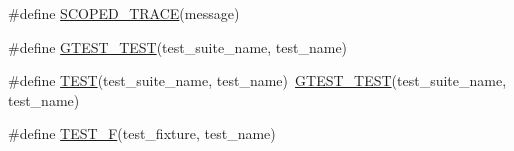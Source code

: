 \begin{DoxyCompactItemize}
\item 
\#define \mbox{\hyperlink{_obj__test_2lib_2googletest-master_2googletest_2include_2gtest_2gtest_8h_a4dac08f15adc8cb1ee0e5c1bfb0f440d}{S\+C\+O\+P\+E\+D\+\_\+\+T\+R\+A\+CE}}(message)
\item 
\#define \mbox{\hyperlink{_obj__test_2lib_2googletest-master_2googletest_2include_2gtest_2gtest_8h_a216a746d9241b1f42fdd4449698a4d8d}{G\+T\+E\+S\+T\+\_\+\+T\+E\+ST}}(test\+\_\+suite\+\_\+name,  test\+\_\+name)
\item 
\#define \mbox{\hyperlink{_obj__test_2lib_2googletest-master_2googletest_2include_2gtest_2gtest_8h_ab5540a6d621853916be8240ff51819cf}{T\+E\+ST}}(test\+\_\+suite\+\_\+name,  test\+\_\+name)~\mbox{\hyperlink{_obj__test_2lib_2googletest-release-1_88_81_2googletest_2test_2gtest__unittest_8cc_a54247aeadc0617105812dca8609638de}{G\+T\+E\+S\+T\+\_\+\+T\+E\+ST}}(test\+\_\+suite\+\_\+name, test\+\_\+name)
\item 
\#define \mbox{\hyperlink{_obj__test_2lib_2googletest-master_2googletest_2include_2gtest_2gtest_8h_a0ee66d464d1a06c20c1929cae09d8758}{T\+E\+S\+T\+\_\+F}}(test\+\_\+fixture,  test\+\_\+name)
\end{DoxyCompactItemize}
